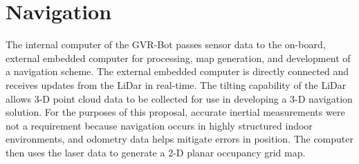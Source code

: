 \section{Navigation}\label{sec:navigation}

The internal computer of the GVR-Bot passes sensor data to the on-board, external embedded computer for processing, map generation, and development of a navigation scheme. The external embedded computer is directly connected and receives updates from the LiDar in real-time. The tilting capability of the LiDar allows 3-D point cloud data to be collected for use in developing a 3-D navigation solution. For the purposes of this proposal, accurate inertial measurements were not a requirement because navigation occurs in highly structured indoor environments, and odometry data helps mitigate errors in position. The computer then uses the laser data to generate a 2-D planar occupancy grid map. 